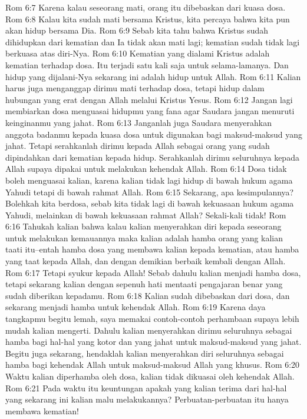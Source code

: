 Rom 6:7  Karena kalau seseorang mati, orang itu dibebaskan dari kuasa dosa.
Rom 6:8  Kalau kita sudah mati bersama Kristus, kita percaya bahwa kita pun akan hidup bersama Dia.
Rom 6:9  Sebab kita tahu bahwa Kristus sudah dihidupkan dari kematian dan Ia tidak akan mati lagi; kematian sudah tidak lagi berkuasa atas diri-Nya.
Rom 6:10  Kematian yang dialami Kristus adalah kematian terhadap dosa. Itu terjadi satu kali saja untuk selama-lamanya. Dan hidup yang dijalani-Nya sekarang ini adalah hidup untuk Allah.
Rom 6:11  Kalian harus juga menganggap dirimu mati terhadap dosa, tetapi hidup dalam hubungan yang erat dengan Allah melalui Kristus Yesus.
Rom 6:12  Jangan lagi membiarkan dosa menguasai hidupmu yang fana agar Saudara jangan menuruti keinginanmu yang jahat.
Rom 6:13  Janganlah juga Saudara menyerahkan anggota badanmu kepada kuasa dosa untuk digunakan bagi maksud-maksud yang jahat. Tetapi serahkanlah dirimu kepada Allah sebagai orang yang sudah dipindahkan dari kematian kepada hidup. Serahkanlah dirimu seluruhnya kepada Allah supaya dipakai untuk melakukan kehendak Allah.
Rom 6:14  Dosa tidak boleh menguasai kalian, karena kalian tidak lagi hidup di bawah hukum agama Yahudi tetapi di bawah rahmat Allah.
Rom 6:15  Sekarang, apa kesimpulannya? Bolehkah kita berdosa, sebab kita tidak lagi di bawah kekuasaan hukum agama Yahudi, melainkan di bawah kekuasaan rahmat Allah? Sekali-kali tidak!
Rom 6:16  Tahukah kalian bahwa kalau kalian menyerahkan diri kepada seseorang untuk melakukan kemauannya maka kalian adalah hamba orang yang kalian taati itu--entah hamba dosa yang membawa kalian kepada kematian, atau hamba yang taat kepada Allah, dan dengan demikian berbaik kembali dengan Allah.
Rom 6:17  Tetapi syukur kepada Allah! Sebab dahulu kalian menjadi hamba dosa, tetapi sekarang kalian dengan sepenuh hati mentaati pengajaran benar yang sudah diberikan kepadamu.
Rom 6:18  Kalian sudah dibebaskan dari dosa, dan sekarang menjadi hamba untuk kehendak Allah.
Rom 6:19  Karena daya tangkapmu begitu lemah, saya memakai contoh-contoh perhambaan supaya lebih mudah kalian mengerti. Dahulu kalian menyerahkan dirimu seluruhnya sebagai hamba bagi hal-hal yang kotor dan yang jahat untuk maksud-maksud yang jahat. Begitu juga sekarang, hendaklah kalian menyerahkan diri seluruhnya sebagai hamba bagi kehendak Allah untuk maksud-maksud Allah yang khusus.
Rom 6:20  Waktu kalian diperhamba oleh dosa, kalian tidak dikuasai oleh kehendak Allah.
Rom 6:21  Pada waktu itu keuntungan apakah yang kalian terima dari hal-hal yang sekarang ini kalian malu melakukannya? Perbuatan-perbuatan itu hanya membawa kematian!
